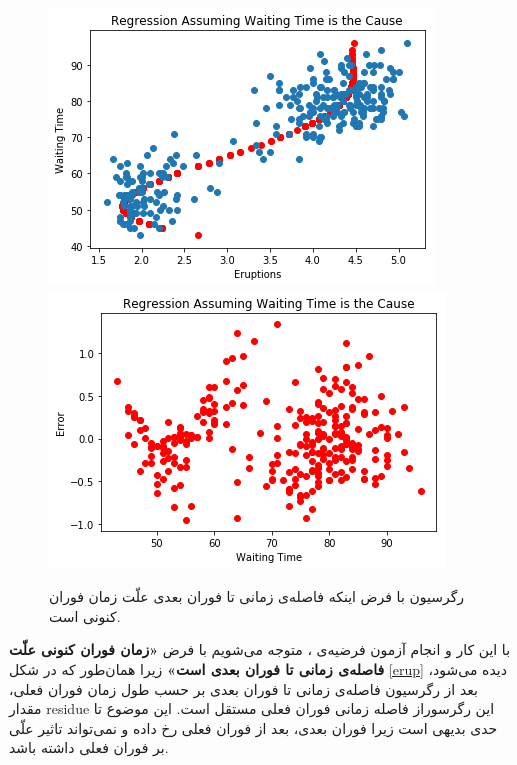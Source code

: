 \documentclass{article}
\begin{document}
\begin{figure}[h]
\begin{floatrow}
\centering
\includegraphics[scale=0.451]{waiting_time1.png}
\includegraphics[scale=0.451]{waiting_time2.png}
\end{floatrow}
\caption{رگرسیون با فرض اینکه فاصله‌ی زمانی تا فوران بعدی علّت زمان فوران کنونی است.}
\label{wait}
\end{figure}
با این کار و انجام آزمون فرضیه‌ی ، متوجه می‌شویم با فرض 
\textbf{«زمان فوران کنونی علّت فاصله‌ی زمانی تا فوران بعدی است» }
زیرا همان‌طور که در شکل \eqref{erup} دیده‌ می‌شود، بعد از رگرسیون فاصله‌ی زمانی تا فوران بعدی بر حسب طول زمان فوران فعلی، مقدار residue این رگرسوراز فاصله‌ زمانی فوران فعلی مستقل است. این موضوع تا حدی بدیهی است زیرا فوران بعدی، بعد از فوران فعلی رخ داده و نمی‌تواند تاثیر علّی بر فوران فعلی داشته باشد.
\end{document}
